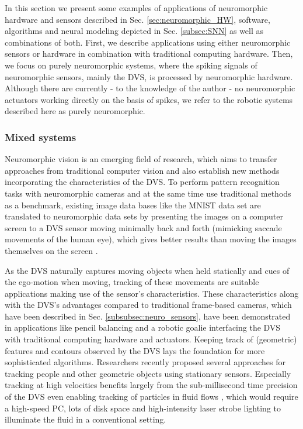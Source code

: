 In this section we present some examples of applications of neuromorphic hardware and sensors described in Sec. \ref{sec:neuromorphic_HW}, software, algorithms and neural modeling depicted in Sec. \ref{subsec:SNN} as well as combinations of both.
First, we describe applications using either neuromorphic sensors or hardware in combination with traditional computing hardware.
Then, we focus on purely neuromorphic systems, where the spiking signals of neuromorphic sensors, mainly the \ac{DVS}, is processed by neuromorphic hardware.
Although there are currently - to the knowledge of the author - no neuromorphic actuators working directly on the basis of spikes, we refer to the robotic systems described here as purely neuromorphic.


\subsubsection{Mixed systems}
\label{subsubsec:mixed_sys}

Neuromorphic vision \cite{Tan2015} is an emerging field of research, which aims to transfer approaches from traditional computer vision and also establish new methods incorporating the characteristics of the \ac{DVS}.
To perform pattern recognition tasks with neuromorphic cameras and at the same time use traditional methods as a benchmark, existing image data bases like the \ac{MNIST} data set \cite{LeCun1998} are translated to neuromorphic data sets by presenting the images on a computer screen to a \ac{DVS} sensor moving minimally back and forth \cite{Orchard2015} (mimicking saccade movements of the human eye), which gives better results than moving the images themselves on the screen \cite{Serrano-Gotarredona2013}.

As the \ac{DVS} naturally captures moving objects when held statically and cues of the ego-motion when moving, tracking of these movements are suitable applications making use of the sensor's characteristics.
These characteristics along with the \ac{DVS}'s advantages compared to traditional frame-based cameras, which have been described in Sec. \ref{subsubsec:neuro_sensors}, have been demonstrated in applications like pencil balancing \cite{Conradt2009} and a robotic goalie \cite{Delbruck2013} interfacing the \ac{DVS} with traditional computing hardware and actuators.
Keeping track of (geometric) features \cite{Lagorce2015} and contours \cite{Barranco2014} observed by the \ac{DVS} lays the foundation for more sophisticated algorithms.
Researchers recently proposed several approaches for tracking people \cite{Schraml2010, Piatkowska2012} and other geometric objects \cite{ReverterValeiras2016} using stationary sensors.
Especially tracking at high velocities \cite{Saner2014} benefits largely from the sub-millisecond time precision of the \ac{DVS} even enabling tracking of particles in fluid flows \cite{Drazen2011}, which would require a high-speed PC, lots of disk space and high-intensity laser strobe lighting to illuminate the fluid in a conventional setting.

